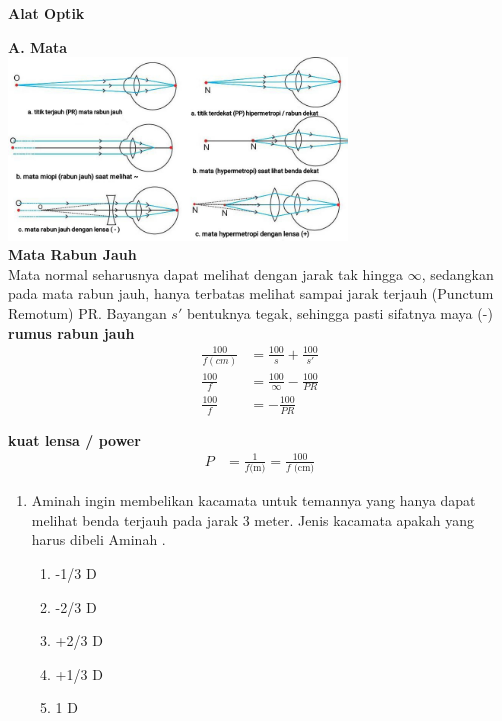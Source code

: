 \documentclass[10pt,a4paper]{extarticle}
\newcommand{\pilgani}[1]{                            \vspace{-0.3cm}\begin{multicols}{2}
 \begin{enumerate}[label=\Alph*., itemsep=0pt,topsep=0pt,leftmargin=*,align=Center]#1                     \end{enumerate}
 \phantom{ini cuma sapi, wedus, dan ayam}
 \end{multicols}}
\begin{document}
 \textbf{Alat Optik} \phantom{ini nama siswa yang aaamengerjakan soal kuis ini }  

\begin{multicols*}{2}\raggedcolumns
\textbf{A. Mata}\\
\includegraphics[width=9cm]{pic/mata} \\
\textbf{Mata Rabun Jauh}\\
Mata normal seharusnya dapat melihat dengan jarak tak hingga $\infty$, sedangkan pada mata rabun jauh, hanya terbatas melihat sampai jarak terjauh (Punctum Remotum) PR. Bayangan $s'$ bentuknya tegak, sehingga pasti sifatnya maya (-)\\
\vspace{0.7cm}
\textbf{rumus rabun jauh}
\vspace{-0.7cm}
\begin{align*}
\frac{100}{f(cm)} &= \frac{100}{s}+\frac{100}{s'}\\
\frac{100}{f} &= \frac{100}{\infty} -\frac{100}{PR}\\
\frac{100}{f} &= -\frac{100}{PR}
\end{align*}


\textbf{kuat lensa / power }
\begin{align*}
P &= \frac{1 }{f\text{(m)}}=\frac{100}{f\text{ (cm)}}
\end{align*}
\vspace{0.8cm}

\begin{enumerate}

\item Aminah ingin membelikan kacamata untuk temannya yang hanya dapat melihat benda terjauh pada jarak 3 meter. Jenis kacamata apakah yang harus dibeli Aminah .
\pilgani{
	\item -1/3 D
	\item -2/3 D
	\item +2/3 D
	\item +1/3 D
	\item 1 D }
\vspace{3cm}


\end{enumerate}
\end{multicols*}
\end{document}
